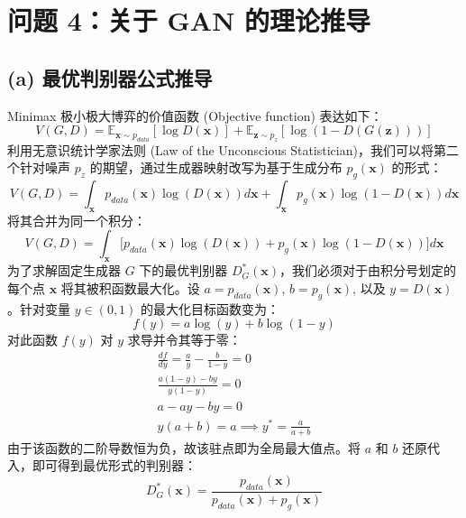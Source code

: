 \documentclass[11pt,UTF8]{ctexart}
\begin{document}
\section*{问题 4：关于 GAN 的理论推导}

\subsection*{(a) 最优判别器公式推导}
Minimax 极小极大博弈的价值函数 (Objective function) 表达如下：
\begin{equation}
    V(G, D) = \mathbb{E}_{\mathbf{x} \sim p_{data}}[ \log D(\mathbf{x}) ] + \mathbb{E}_{\mathbf{z} \sim p_z}[ \log(1 - D(G(\mathbf{z}))) ]
\end{equation}
利用无意识统计学家法则 (Law of the Unconscious Statistician)，我们可以将第二个针对噪声 $p_z$ 的期望，通过生成器映射改写为基于生成分布 $p_g(\mathbf{x})$ 的形式：
\begin{equation}
    V(G, D) = \int_{\mathbf{x}} p_{data}(\mathbf{x}) \log(D(\mathbf{x})) d\mathbf{x} + \int_{\mathbf{x}} p_g(\mathbf{x}) \log(1 - D(\mathbf{x})) d\mathbf{x}
\end{equation}
将其合并为同一个积分：
\begin{equation}
    V(G, D) = \int_{\mathbf{x}} \Big[ p_{data}(\mathbf{x}) \log(D(\mathbf{x})) + p_g(\mathbf{x}) \log(1 - D(\mathbf{x})) \Big] d\mathbf{x}
\end{equation}
为了求解固定生成器 $G$ 下的最优判别器 $D^*_G(\mathbf{x})$，我们必须对于由积分号划定的每个点 $\mathbf{x}$ 将其被积函数最大化。设 $a = p_{data}(\mathbf{x})$, $b = p_g(\mathbf{x})$, 以及 $y = D(\mathbf{x})$。针对变量 $y \in (0,1)$ 的最大化目标函数变为：
\begin{equation}
    f(y) = a \log(y) + b \log(1 - y)
\end{equation}
对此函数 $f(y)$ 对 $y$ 求导并令其等于零：
\begin{align*}
    \frac{df}{dy} = \frac{a}{y} - \frac{b}{1 - y} = 0 \\
    \frac{a(1 - y) - by}{y(1 - y)} = 0 \\
    a - ay - by = 0 \\
    y(a + b) = a \implies y^* = \frac{a}{a + b}
\end{align*}
由于该函数的二阶导数恒为负，故该驻点即为全局最大值点。将 $a$ 和 $b$ 还原代入，即可得到最优形式的判别器：
\begin{equation}
    D^*_G(\mathbf{x}) = \frac{p_{data}(\mathbf{x})}{p_{data}(\mathbf{x}) + p_g(\mathbf{x})}
\end{equation}
\end{document}
